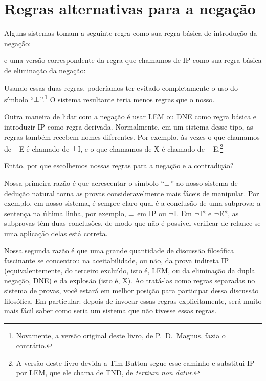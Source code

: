 \section{Regras alternativas para a negação}
Alguns sistemas tomam a seguinte regra como sua regra básica de introdução da negação:
\begin{fitchproof}
	\open
		\AS
	\close
\end{fitchproof}
e uma versão correspondente da regra que chamamos de IP como sua regra básica de eliminação da negação:
\begin{fitchproof}
	\open
		 \AS
	\close
\end{fitchproof}
Usando essas duas regras, poderíamos ter evitado completamente o uso do símbolo \textquotedblleft $\bot$\textquotedblright{}.\footnote{Novamente, a versão original deste livro, de P.~D.\ Magnus, fazia o contrário.} O sistema resultante teria menos regras que o nosso.

Outra maneira de lidar com a negação é usar LEM ou DNE como regra básica e introduzir IP como regra derivada. Normalmente, em um sistema desse tipo, as regras também recebem nomes diferentes. Por exemplo, às vezes o que chamamos de $\neg$E é chamado de $\bot$I, e o que chamamos de X é chamado de $\bot$E.\footnote{A versão deste livro devida a Tim Button segue esse caminho e substitui IP por LEM, que ele chama de TND, de \textit{tertium non datur}.}

Então, por que escolhemos nossas regras para a negação e a contradição?

Nossa primeira razão é que acrescentar o símbolo \textquotedblleft $\bot$\textquotedblright{} ao nosso sistema de dedução natural torna as provas consideravelmente mais fáceis de manipular. Por exemplo, em nosso sistema, é sempre claro qual é a conclusão de uma subprova: a sentença na última linha, por exemplo, $\bot$ em IP ou $\neg$I. Em $\neg$I* e $\neg$E*, as subprovas têm duas conclusões, de modo que não é possível verificar de relance se uma aplicação delas está correta.

Nossa segunda razão é que uma grande quantidade de discussão filosófica fascinante se concentrou na aceitabilidade, ou não, da prova indireta IP (equivalentemente, do terceiro excluído, isto é, LEM, ou da eliminação da dupla negação, DNE) e da explosão (isto é, X). Ao tratá-las como regras separadas no sistema de provas, você estará em melhor posição para participar dessa discussão filosófica. Em particular: depois de invocar essas regras explicitamente, será muito mais fácil saber como seria um sistema que não tivesse essas regras.

